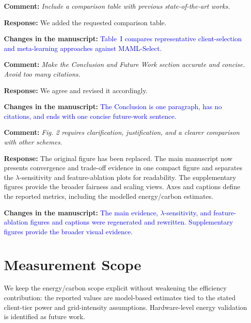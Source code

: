 \documentclass[11pt]{article}
\newcommand{\comment}[1]{\textbf{Comment:} \textit{#1}}
\newcommand{\response}[1]{\textbf{Response:} #1}
\newcommand{\change}[1]{\textbf{Changes in the manuscript:} \textcolor{blue}{#1}}
\begin{document}
\comment{Include a comparison table with previous state-of-the-art works.}

\response{We added the requested comparison table.}

\change{Table~I compares representative client-selection and meta-learning approaches against MAML-Select.}

\comment{Make the Conclusion and Future Work section accurate and concise. Avoid too many citations.}

\response{We agree and revised it accordingly.}

\change{The Conclusion is one paragraph, has no citations, and ends with one concise future-work sentence.}

\comment{Fig. 2 requires clarification, justification, and a clearer comparison with other schemes.}

\response{The original figure has been replaced. The main manuscript now presents convergence and trade-off evidence in one compact figure and separates the $\lambda$-sensitivity and feature-ablation plots for readability. The supplementary figures provide the broader fairness and scaling views. Axes and captions define the reported metrics, including the modelled energy/carbon estimates.}

\change{The main evidence, $\lambda$-sensitivity, and feature-ablation figures and captions were regenerated and rewritten. Supplementary figures provide the broader visual evidence.}

\section*{Measurement Scope}

We keep the energy/carbon scope explicit without weakening the efficiency contribution: the reported values are model-based estimates tied to the stated client-tier power and grid-intensity assumptions. Hardware-level energy validation is identified as future work.
\end{document}
